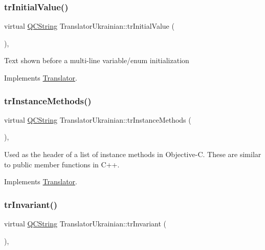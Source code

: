 \subsubsection{\texorpdfstring{trInitialValue()}{trInitialValue()}}
{\footnotesize\ttfamily virtual \mbox{\hyperlink{class_q_c_string}{Q\+C\+String}} Translator\+Ukrainian\+::tr\+Initial\+Value (\begin{DoxyParamCaption}{ }\end{DoxyParamCaption})\hspace{0.3cm}{\ttfamily [inline]}, {\ttfamily [virtual]}}

Text shown before a multi-\/line variable/enum initialization 

Implements \mbox{\hyperlink{class_translator}{Translator}}.

\mbox{\label{class_translator_ukrainian_aab99123524ff8c75f60722970ad7fa18}} 
\subsubsection{\texorpdfstring{trInstanceMethods()}{trInstanceMethods()}}
{\footnotesize\ttfamily virtual \mbox{\hyperlink{class_q_c_string}{Q\+C\+String}} Translator\+Ukrainian\+::tr\+Instance\+Methods (\begin{DoxyParamCaption}{ }\end{DoxyParamCaption})\hspace{0.3cm}{\ttfamily [inline]}, {\ttfamily [virtual]}}

Used as the header of a list of instance methods in Objective-\/C. These are similar to public member functions in C++. 

Implements \mbox{\hyperlink{class_translator}{Translator}}.

\mbox{\label{class_translator_ukrainian_ad547e6316f82b4d41b0e79bf56f843df}} 
\subsubsection{\texorpdfstring{trInvariant()}{trInvariant()}}
{\footnotesize\ttfamily virtual \mbox{\hyperlink{class_q_c_string}{Q\+C\+String}} Translator\+Ukrainian\+::tr\+Invariant (\begin{DoxyParamCaption}{ }\end{DoxyParamCaption})\hspace{0.3cm}{\ttfamily [inline]}, {\ttfamily [virtual]}}


